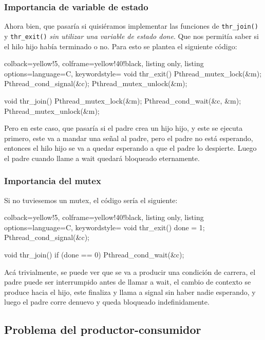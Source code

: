 \documentclass[openany]{book}
\begin{document}
\subsubsection{Importancia de variable de estado}
Ahora bien, que pasaría si quisiéramos implementar las funciones de \texttt{thr\_join()} y \texttt{thr\_exit()} \textit{sin utilizar una variable de estado done}. Que nos permitía saber si el hilo hijo había terminado o no. Para esto se plantea el siguiente código:

\begin{tcblisting}{colback=yellow!5, colframe=yellow!40!black, listing only, listing options={language=C, keywordstyle=\color{blue!35!white}\bfseries}}
void thr_exit() {
    Pthread_mutex_lock(&m);
    Pthread_cond_signal(&c);
    Pthread_mutex_unlock(&m);
}

void thr_join() {
    Pthread_mutex_lock(&m);
    Pthread_cond_wait(&c, &m);
    Pthread_mutex_unlock(&m);
}
\end{tcblisting}

Pero en este caso, que pasaría si el padre crea un hijo hijo, y este se ejecuta primero, este va a mandar una señal al padre, pero el padre no está esperando, entonces el hilo hijo se va a quedar esperando a que el padre lo despierte. Luego el padre cuando llame a wait quedará bloqueado eternamente.

\subsubsection{Importancia del mutex}

Si no tuviesemos un mutex, el código sería el siguiente:

\begin{tcblisting}{colback=yellow!5, colframe=yellow!40!black, listing only, listing options={language=C, keywordstyle=\color{blue!35!white}\bfseries}}
void thr_exit() {
    done = 1;
    Pthread_cond_signal(&c);
}
        
void thr_join() {
    if (done == 0)
        Pthread_cond_wait(&c);
}
\end{tcblisting}

Acá trivialmente, se puede ver que se va a producir una condición de carrera, el padre puede ser interrumpido antes de llamar a wait, el cambio de contexto se produce hacia el hijo, este finaliza y llama a signal sin haber nadie esperando, y luego el padre corre denuevo y queda bloqueado indefinidamente.


\subsection{Problema del productor-consumidor}
\end{document}
